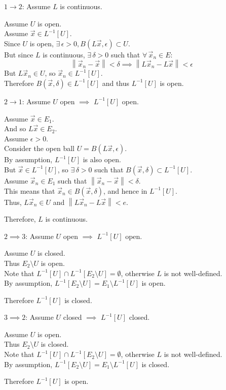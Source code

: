 \documentclass[letterpaper,12pt,fleqn]{article}
\newcommand{\vx}{\vec{x}}
\newcommand{\norm}[1]{\left\|#1\right\|}
\renewcommand{\d}{\delta}
\newcommand{\e}{\epsilon}
\begin{document}
\begin{theproof}
  \listbreak
  \begin{description}
  \item $1\to2$: Assume $L$ is continuous.

    Assume $U$ is open. \\
    Assume $\vx\in L^{-1}[U]$. \\
    Since $U$ is open, $\exists\,\e>0,B(L\vx,\e)\subset U$. \\
    But since $L$ is continuous, $\exists\,\d>0$ such that
    $\forall\,\vx_n\in E$:
    \[\norm{\vx_n-\vx}<\d\implies\norm{L\vx_n-L\vx}<\e\]
    But $L\vx_n\in U$, so $\vx_n\in L^{-1}[U]$. \\
    Therefore $B(\vx,\d)\in L^{-1}[U]$ and thus $L^{-1}[U]$ is open.

  \item $2\to1$: Assume $U$ open $\implies$ $L^{-1}[U]$ open.

    Assume $\vx\in E_1$. \\
    And so $L\vx\in E_2$. \\
    Assume $\e>0$. \\
    Consider the open ball $U=B(L\vx,\e)$. \\
    By assumption, $L^{-1}[U]$ is also open. \\
    But $\vx\in L^{-1}[U]$, so $\exists\,\d>0$ such that
    $B(\vx,\d)\subset L^{-1}[U]$. \\
    Assume $\vx_n\in E_1$ such that $\norm{\vx_n-\vx}<\d$. \\
    This means that $\vx_n\in B(\vx,\d)$, and hence in $L^{-1}[U]$. \\
    Thus, $L\vx_n\in U$ and $\norm{L\vx_n-L\vx}<e$.

    Therefore, $L$ is continuous.

  \item $2\implies3$: Assume $U$ open $\implies$ $L^{-1}[U]$ open.

    Assume $U$ is closed. \\
    Thus $E_2\setminus U$ is open. \\
    Note that $L^{-1}[U]\cap L^{-1}[E_2\setminus U]=\emptyset$, otherwise $L$ is
    not well-defined. \\
    By assumption, $L^{-1}[E_2\setminus U]=E_1\setminus L^{-1}[U]$ is open.

    Therefore $L^{-1}[U]$ is closed.

  \item $3\implies2$: Assume $U$ closed $\implies$ $L^{-1}[U]$ closed.
    
    Assume $U$ is open. \\
    Thus $E_2\setminus U$ is closed. \\
    Note that $L^{-1}[U]\cap L^{-1}[E_2\setminus U]=\emptyset$, otherwise $L$ is
    not well-defined. \\
    By assumption, $L^{-1}[E_2\setminus U]=E_1\setminus L^{-1}[U]$ is closed.

    Therefore $L^{-1}[U]$ is open.
  \end{description}
\end{theproof}
\end{document}
